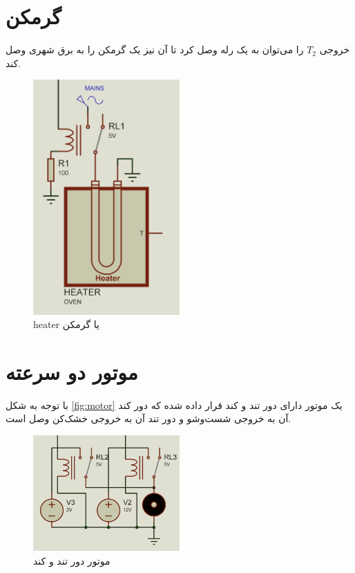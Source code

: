 \section{
گرمکن
}
خروجی
$T_2$
را می‌توان به یک رله وصل کرد تا آن نیز یک گرمکن را به برق شهری وصل کند.

\begin{figure}[h!]
    \centering
    \includegraphics[width=0.5\textwidth]{part1/6.png}
    \caption{
    heater یا گرمکن
    }
    \label{fig:heater}
\end{figure}


\section{
موتور دو سرعته
}

با توجه به شکل
\eqref{fig:motor}
یک موتور دارای دور تند و کند قرار داده شده که دور کند آن به خروجی شست‌و‌شو و دور تند آن به خروجی خشک‌کن وصل است.

\begin{figure}[h!]
    \centering
    \includegraphics[width=0.5\textwidth]{part1/8.png}
    \caption{
    موتور دور تند و کند
    }
    \label{fig:motor}
\end{figure}


